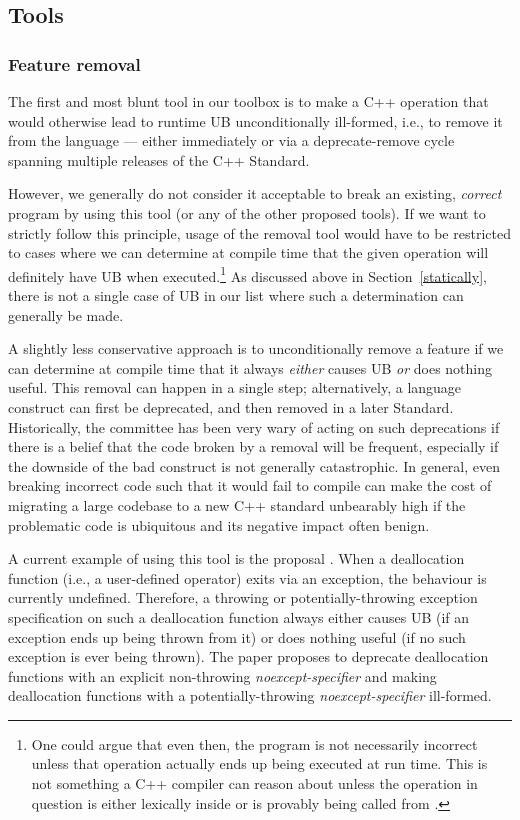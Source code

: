 {\subsection{Tools}
\label{tools}

\subsubsection{Feature removal}
\label{removal}

The first and most blunt tool in our toolbox is to make a C++ operation that would otherwise lead to runtime UB unconditionally ill-formed, i.e., to remove it from the language --- either immediately or via a deprecate-remove cycle spanning multiple releases of the C++ Standard.

However, we generally do not consider it acceptable to break an existing, \emph{correct} program by using this tool (or any of the other proposed tools). If we want to strictly follow this principle, usage of the removal tool would have to be restricted to cases where we can determine at compile time that the given operation will definitely have UB when executed.\footnote{One could argue that even then, the program is not necessarily incorrect unless that operation actually ends up being executed at run time. This is not something a C++ compiler can reason about unless the operation in question is either lexically inside  or is provably being called from .} As discussed above in Section~\ref{statically}, there is not a single case of UB in our list where such a determination can generally be made.

A slightly less conservative approach is to unconditionally remove a feature if we can determine at compile time that it always \emph{either} causes UB \emph{or} does nothing useful. This removal can happen in a single step; alternatively, a language construct can first be deprecated, and then removed in a later Standard. Historically, the committee has been very wary of acting on such deprecations if there is a belief that the code broken by a removal will be frequent, especially if the downside of the bad construct is not generally catastrophic. In general, even breaking incorrect code such that it would fail to compile can make the cost of migrating a large codebase to a new C++ standard unbearably high if the problematic code is ubiquitous and its negative impact often benign.  

A current example of using this tool is the proposal \cite{P3424R0}. When a deallocation function (i.e., a user-defined  operator) exits via an exception, the behaviour is currently undefined. Therefore, a throwing or potentially-throwing exception specification on such a deallocation function always either causes UB (if an exception ends up being thrown from it) or does nothing useful (if no such exception is ever being thrown). The paper proposes to deprecate deallocation functions with an explicit non-throwing \emph{noexcept-specifier} and making deallocation functions with a potentially-throwing \emph{noexcept-specifier} ill-formed.

}
